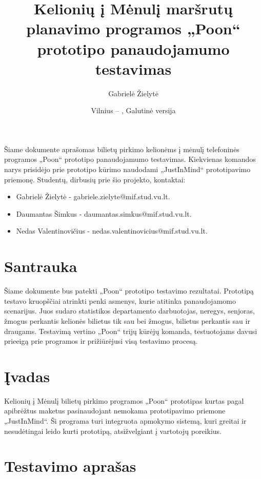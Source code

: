 \documentclass{VUMIFPSkursinis}
\title{Kelionių į Mėnulį maršrutų planavimo programos „Poon“ prototipo panaudojamumo testavimas}
\author{Gabrielė Žielytė}
\date{Vilnius – \the\year, Galutinė versija}
\begin{document}
	
\maketitle

\thispagestyle{empty}
\tableofcontents

Šiame dokumente aprašomas bilietų pirkimo kelionėms į mėnulį telefoninės programos „Poon“ prototipo panaudojamumo testavimas. Kiekvienas komandos narys prisidėjo prie prototipo kūrimo naudodami „JustInMind“ prototipavimo priemonę. Studentų, dirbusių prie šio projekto, kontaktai:
\begin{itemize}
\item Gabrielė Žielytė - gabriele.zielyte@mif.stud.vu.lt. 
\item Daumantas Šimkus - daumantas.simkus@mif.stud.vu.lt. 
\item Nedas Valentinovičius - nedas.valentinovicius@mif.stud.vu.lt.
\end{itemize}
\thispagestyle{empty}

\cleardoublepage{}
\setcounter{page}{4}

\section{Santrauka}
Šiame dokumente bus patekti „Poon“ prototipo testavimo rezultatai. Prototipą testavo kruopščiai atrinkti penki asmenys, kurie atitinka panaudojamomo scenarijus. Juos sudaro statistikos departamento darbuotojas, neregys, senjoras, žmogus perkantis kelionės bilietus tik sau bei žmogus, bilietus perkantis sau ir draugams. Testavimą vertino „Poon“ trijų kūrėjų komanda, testuotojams davusi prieeigą prie programos ir prižiūrėjusi visą testavimo procesą.

\section{Įvadas}
Kelionių į Mėnulį bilietų pirkimo programos „Poon“ prototipas kurtas pagal apibrėžtus maketus pasinaudojant nemokama prototipavimo priemone „JustInMind“. Ši programa turi integruota apmokymo sistemą, kuri greitai ir nesudėtingai leido kurti prototipą, atsižvelgiant į vartotojų poreikius.


\section{Testavimo aprašas}
\end{document}
